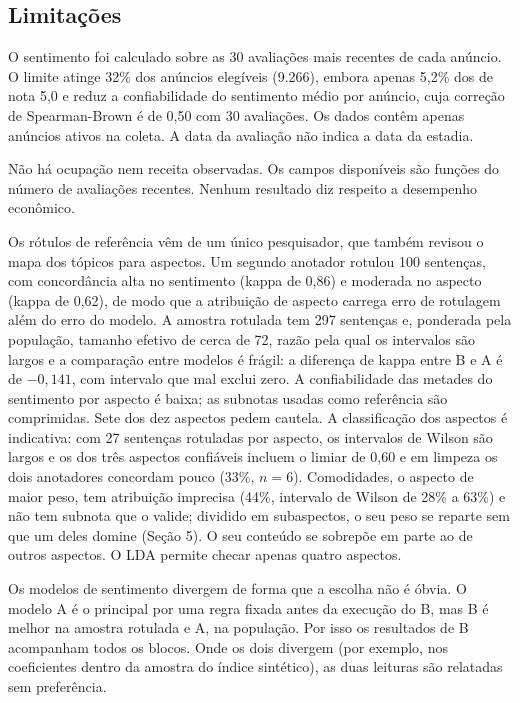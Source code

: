 \subsection{Limitações}

O sentimento foi calculado sobre as 30 avaliações mais recentes de cada anúncio. O limite atinge 32\% dos anúncios elegíveis (9.266), embora apenas 5,2\% dos de nota 5,0 e reduz a confiabilidade do sentimento médio por anúncio, cuja correção de Spearman-Brown é de 0,50 com 30 avaliações. Os dados contêm apenas anúncios ativos na coleta. A data da avaliação não indica a data da estadia.

Não há ocupação nem receita observadas. Os campos disponíveis são funções do número de avaliações recentes. Nenhum resultado diz respeito a desempenho econômico.

Os rótulos de referência vêm de um único pesquisador, que também revisou o mapa dos tópicos para aspectos. Um segundo anotador rotulou 100 sentenças, com concordância alta no sentimento (kappa de 0,86) e moderada no aspecto (kappa de 0,62), de modo que a atribuição de aspecto carrega erro de rotulagem além do erro do modelo. A amostra rotulada tem 297 sentenças e, ponderada pela população, tamanho efetivo de cerca de 72, razão pela qual os intervalos são largos e a comparação entre modelos é frágil: a diferença de kappa entre B e A é de $-0{,}141$, com intervalo que mal exclui zero. A confiabilidade das metades do sentimento por aspecto é baixa; as subnotas usadas como referência são comprimidas. Sete dos dez aspectos pedem cautela. A classificação dos aspectos é indicativa: com 27 sentenças rotuladas por aspecto, os intervalos de Wilson são largos e os dos três aspectos confiáveis incluem o limiar de 0,60 e em limpeza os dois anotadores concordam pouco (33\%, $n = 6$). Comodidades, o aspecto de maior peso, tem atribuição imprecisa (44\%, intervalo de Wilson de 28\% a 63\%) e não tem subnota que o valide; dividido em subaspectos, o seu peso se reparte sem que um deles domine (Seção 5). O seu conteúdo se sobrepõe em parte ao de outros aspectos. O LDA permite checar apenas quatro aspectos.

Os modelos de sentimento divergem de forma que a escolha não é óbvia. O modelo A é o principal por uma regra fixada antes da execução do B, mas B é melhor na amostra rotulada e A, na população. Por isso os resultados de B acompanham todos os blocos. Onde os dois divergem (por exemplo, nos coeficientes dentro da amostra do índice sintético), as duas leituras são relatadas sem preferência.

